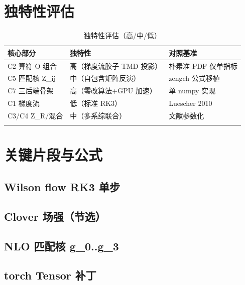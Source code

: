 \documentclass[UTF8]{ctexart}
\begin{document}
\section{独特性评估}
\begin{xltabular}{\textwidth}{XXX}
\toprule
核心部分 & 独特性 & 对照基准 \\
\midrule
C2 算符 O 组合 & 高（梯度流胶子 TMD 投影） & 朴素准 PDF 仅单指标 \\
C5 匹配核 Z\_ij & 中（自包含矩阵反演） & zengch 公式移植 \\
C7 三后端骨架 & 高（零改算法+GPU 加速） & 单 numpy 实现 \\
C1 梯度流 & 低（标准 RK3） & Luescher 2010 \\
C3/C4 Z\_R/混合 & 中（多系综联合） & 文献参数化 \\
\bottomrule
\caption{独特性评估（高/中/低）}
\end{xltabular}

\section{关键片段与公式}
\subsection{Wilson flow RK3 单步}

\subsection{Clover 场强（节选）}

\subsection{NLO 匹配核 g\_0..g\_3}

\subsection{torch Tensor 补丁}


\end{document}
